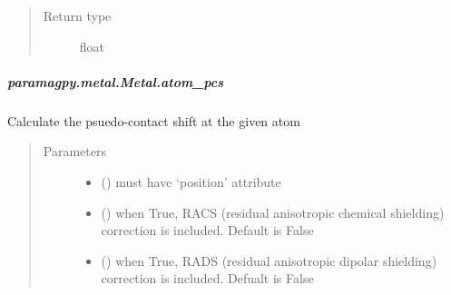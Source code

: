\documentclass[a4paper,10pt,english]{sphinxmanual}
\begin{document}
\begin{fulllineitems}
\begin{fulllineitems}
\begin{fulllineitems}
\begin{quote}
\begin{description}
\item[{Return type}] \leavevmode
float

\end{description}\end{quote}

\end{fulllineitems}



\subparagraph{paramagpy.metal.Metal.atom\_pcs}
\label{\detokenize{reference/generated/paramagpy.metal.Metal.atom_pcs:paramagpy-metal-metal-atom-pcs}}\label{\detokenize{reference/generated/paramagpy.metal.Metal.atom_pcs::doc}}

\begin{fulllineitems}
\label{\detokenize{reference/generated/paramagpy.metal.Metal.atom_pcs:paramagpy.metal.Metal.atom_pcs}}
Calculate the psuedo-contact shift at the given atom
\begin{quote}\begin{description}
\item[{Parameters}] \leavevmode\begin{itemize}
\item {} 
 () \textendash{} must have ‘position’ attribute

\item {} 
 (\sphinxstyleliteralemphasis{\sphinxupquote{ (}}\sphinxstyleliteralemphasis{\sphinxupquote{)}}) \textendash{} when True, RACS (residual anisotropic chemical shielding)
correction is included. Default is False

\item {} 
 (\sphinxstyleliteralemphasis{\sphinxupquote{ (}}\sphinxstyleliteralemphasis{\sphinxupquote{)}}) \textendash{} when True, RADS (residual anisotropic dipolar shielding)
correction is included. Defualt is False

\end{itemize}


\end{description}
\end{quote}
\end{fulllineitems}
\end{fulllineitems}
\end{fulllineitems}
\end{document}
